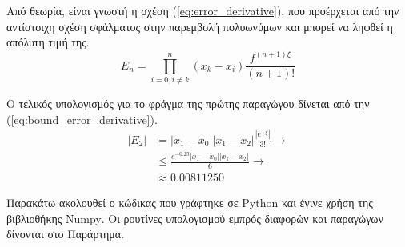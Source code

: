 \documentclass[assignment3.tex]{subfiles}
\begin{document}
Από θεωρία, είναι γνωστή η σχέση (\ref{eq:error_derivative}), που προέρχεται από την αντίστοιχη σχέση σφάλματος στην παρεμβολή πολυωνύμων και μπορεί να ληφθεί η απόλυτη τιμή της.
\begin{equation}
E_n = \prod_{i=0,i\neq k}^{n}(x_k-x_i)\frac{f^{(n+1)\xi}}{(n+1)!}
\label{eq:error_derivative}
\end{equation}

Ο τελικός υπολογισμός για το φράγμα της πρώτης παραγώγου δίνεται από την (\ref{eq:bound_error_derivative}).
\begin{equation}
\begin{split}
|E_2| &= |x_1-x_0||x_1-x_2|\frac{|e^{-\xi}|}{3!}\rightarrow \\
& \leq \frac{e^{-0.25}|x_1-x_0||x_1-x_2|}{6} \rightarrow \\
&\approx 0.00811250
\end{split}
\label{eq:bound_error_derivative}
\end{equation}

Παρακάτω ακολουθεί ο κώδικας που γράφτηκε σε \textlatin{Python} και έγινε χρήση της βιβλιοθήκης \textlatin{Numpy}. Οι ρουτίνες υπολογισμού εμπρός διαφορών και παραγώγων δίνονται στο Παράρτημα.

\end{document}
